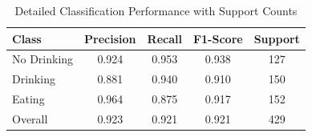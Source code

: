 
\begin{table}[h]
\centering
\caption{Detailed Classification Performance with Support Counts}
\label{tab:detailed_classification}
\begin{tabular}{l|ccc|c}
\hline
\textbf{Class} & \textbf{Precision} & \textbf{Recall} & \textbf{F1-Score} & \textbf{Support} \\
\hline
No Drinking & 0.924 & 0.953 & 0.938 & 127 \\
Drinking & 0.881 & 0.940 & 0.910 & 150 \\
Eating & 0.964 & 0.875 & 0.917 & 152 \\
\hline
Overall & 0.923 & 0.921 & 0.921 & 429 \\
\hline
\end{tabular}
\end{table}
